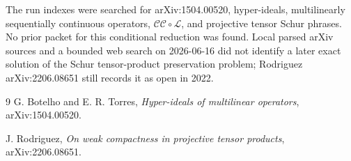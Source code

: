 \documentclass[11pt]{amsart}
\newcommand{\CC}{\mathcal{CC}}
\newcommand{\LLL}{\mathcal{L}}
\begin{document}
The run indexes were searched for arXiv:1504.00520, hyper-ideals,
multilinearly sequentially continuous operators, \(\CC\circ\LLL\), and
projective tensor Schur phrases. No prior packet for this conditional
reduction was found. Local parsed arXiv sources and a bounded web search on
2026-06-16 did not identify a later exact solution of the Schur
tensor-product preservation problem; Rodriguez arXiv:2206.08651 still records
it as open in 2022.

\begin{thebibliography}{9}
G. Botelho and E. R. Torres,
\emph{Hyper-ideals of multilinear operators},
arXiv:1504.00520.

J. Rodriguez,
\emph{On weak compactness in projective tensor products},
arXiv:2206.08651.
\end{thebibliography}
\end{document}
